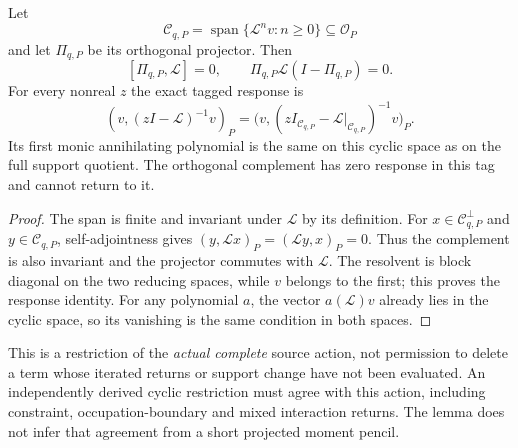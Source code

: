 \documentclass[12pt,a4paper]{article}
\begin{document}
\begin{lemma}
\label{p4:lem:v2186-exact-source-cyclic-action}
Let
\[
 \mathscr C_{q,P}
 =\operatorname{span}\{\mathcal L^n v:n\ge0\}\subseteq\mathscr O_P
\]
and let $\Pi_{q,P}$ be its orthogonal projector.  Then
\[
 [\Pi_{q,P},\mathcal L]=0,\qquad
 \Pi_{q,P}\mathcal L(I-\Pi_{q,P})=0.
\]
For every nonreal $z$ the exact tagged response is
\[
 (v,(zI-\mathcal L)^{-1}v)_P
 =\bigl(v,(zI_{\mathscr C_{q,P}}
             -\mathcal L|_{\mathscr C_{q,P}})^{-1}v\bigr)_P.
\]
Its first monic annihilating polynomial is the same on this cyclic space
as on the full support quotient.  The orthogonal complement has zero
response in this tag and cannot return to it.
\end{lemma}
\begin{proof}
The span is finite and invariant under $\mathcal L$ by its definition.
For $x\in\mathscr C_{q,P}^{\perp}$ and $y\in\mathscr C_{q,P}$,
self-adjointness gives
$(y,\mathcal Lx)_P=(\mathcal Ly,x)_P=0$.
Thus the complement is also invariant and the projector commutes with
$\mathcal L$.  The resolvent is block diagonal on the two reducing spaces,
while $v$ belongs to the first; this proves the response identity.
For any polynomial $a$, the vector $a(\mathcal L)v$ already lies in the
cyclic space, so its vanishing is the same condition in both spaces.
\end{proof}

This is a restriction of the \emph{actual complete} source action, not
permission to delete a term whose iterated returns or support change have
not been evaluated.  An independently derived cyclic restriction must
agree with this action, including constraint, occupation-boundary and mixed
interaction returns.  The lemma does not infer that agreement from a
short projected moment pencil.
\end{document}

